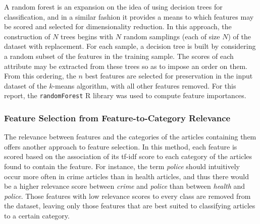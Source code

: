 \documentclass[11pt]{article}
\begin{document}
A random forest \cite{Breiman:2001:RF:570181.570182} is an expansion on the idea of using decision trees for classification, and in a similar fashion it provides a means to which features may be scored and selected for dimensionality reduction.
In this approach, the construction of $N$ trees begins with $N$ random samplings (each of size $N$) of the dataset with replacement.
For each sample, a decision tree is built by considering a random subset of the features in the training sample.
The scores of each attribute may be extracted from these trees so as to impose an order on them.
From this ordering, the $n$ best features are selected for preservation in the input dataset of the $k$-means algorithm, with all other features removed.
For this report, the \texttt{randomForest} R library \cite{randomforest} was used to compute feature importances.


\subsubsection{Feature Selection from Feature-to-Category Relevance}

The relevance between features and the categories of the articles containing them offers another approach to feature selection.
In this method, each feature is scored based on the association of its tf-idf score to each category of the articles found to contain the feature.
For instance, the term \emph{police} should intuitively occur more often in crime articles than in health articles, and thus there would be a higher relevance score between \emph{crime} and \emph{police} than between \emph{health} and \emph{police}.
Those features with low relevance scores to every class are removed from the dataset, leaving only those features that are best suited to classifying articles to a certain category.
\end{document}
